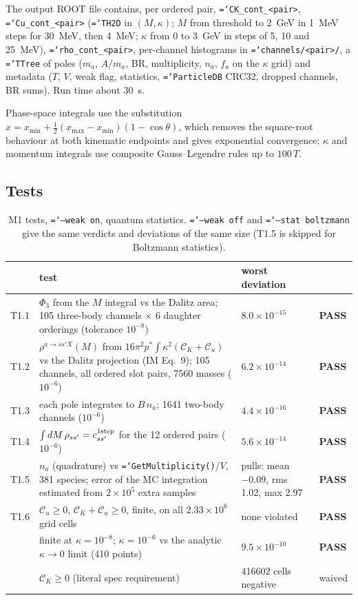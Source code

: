 \documentclass[11pt,a4paper]{article}
\newcommand{\CK}{\mathcal C_K}
\newcommand{\Cu}{\mathcal C_u}
\newcommand{\pass}{\textcolor{green!45!black}{\textbf{PASS}}}
\newcommand{\code}[1]{\texttt{\hyphenchar\font=`\-#1}}
\begin{document}
The output ROOT file contains, per ordered pair, \code{CK\_cont\_<pair>}, \code{Cu\_cont\_<pair>}
(\code{TH2D} in $(M,\kappa)$; $M$ from threshold to 2~GeV in 1~MeV steps for 30~MeV, then 4~MeV;
$\kappa$ from 0 to 3~GeV in steps of 5, 10 and 25~MeV), \code{rho\_cont\_<pair>}, per-channel
histograms in \code{channels/<pair>/}, a \code{TTree} of poles ($m_a$, $A/m_a$, BR,
multiplicity, $n_a$, $f_a$ on the $\kappa$ grid) and metadata ($T$, $V$, weak flag, statistics,
\code{ParticleDB} CRC32, dropped channels, BR sums). Run time about 30~s.

Phase-space integrals use the substitution $x=x_{\min}+\tfrac12(x_{\max}-x_{\min})(1-\cos\theta)$,
which removes the square-root behaviour at both kinematic endpoints and gives exponential
convergence; $\kappa$ and momentum integrals use composite Gauss--Legendre rules up to $100\,T$.

\subsection{Tests}

\begin{table}[h]
\centering\small
\begin{tabular}{lp{7.8cm}p{3.4cm}l}
\toprule
& test & worst deviation & \\
\midrule
T1.1 & $\Phi_3$ from the $M$ integral vs the Dalitz area; 105 three-body channels $\times$ 6
       daughter orderings (tolerance $10^{-8}$) & $8.0\times10^{-15}$ & \pass \\
T1.2 & $\rho^{a\to ss'X}(M)$ from $16\pi^2p^*\!\int\kappa^2(\CK+\Cu)$ vs the Dalitz projection
       (IM Eq.~9); 105 channels, all ordered slot pairs, 7560 masses ($10^{-6}$) &
       $6.2\times10^{-14}$ & \pass \\
T1.3 & each pole integrates to $B\,n_a$; 1641 two-body channels ($10^{-6}$) &
       $4.4\times10^{-16}$ & \pass \\
T1.4 & $\int dM\,\rho_{ss'}=c^{\rm 1step}_{ss'}$ for the 12 ordered pairs ($10^{-6}$) &
       $5.6\times10^{-14}$ & \pass \\
T1.5 & $n_a$ (quadrature) vs \code{GetMultiplicity()}$/V$, 381 species; error of the MC
       integration estimated from $2\times10^5$ extra samples &
       pulls: mean $-0.09$, rms 1.02, max 2.97 & \pass \\
T1.6 & $\Cu\ge0$, $\CK+\Cu\ge0$, finite, on all $2.33\times10^6$ grid cells & none violated & \pass \\
     & finite at $\kappa=10^{-8}$; $\kappa=10^{-6}$ vs the analytic $\kappa\to0$ limit (410 points) &
       $9.5\times10^{-10}$ & \pass \\
     & $\CK\ge0$ (literal spec requirement) & 416602 cells negative & waived \\
\bottomrule
\end{tabular}
\caption{M1 tests, \code{--weak on}, quantum statistics. \code{--weak off} and \code{--stat
boltzmann} give the same verdicts and deviations of the same size (T1.5 is skipped for Boltzmann
statistics).}
\label{tab:m1}
\end{table}
\end{document}

